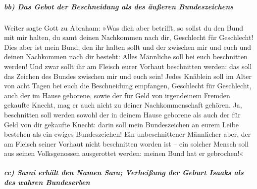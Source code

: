 \hypertarget{bb-das-gebot-der-beschneidung-als-des-uxe4uuxdferen-bundeszeichens}{%
\subparagraph{bb) Das Gebot der Beschneidung als des äußeren
Bundeszeichens}\label{bb-das-gebot-der-beschneidung-als-des-uxe4uuxdferen-bundeszeichens}}

 Weiter sagte Gott zu Abraham: »Was dich aber betrifft, so
sollst du den Bund mit mir halten, du samt deinen Nachkommen nach dir,
Geschlecht für Geschlecht!  Dies aber ist mein Bund, den
ihr halten sollt und der zwischen mir und euch und deinen Nachkommen
nach dir besteht: Alles Männliche soll bei euch beschnitten werden!
 Und zwar sollt ihr am Fleisch eurer Vorhaut beschnitten
werden: das soll das Zeichen des Bundes zwischen mir und euch sein!
 Jedes Knäblein soll im Alter von acht Tagen bei euch die
Beschneidung empfangen, Geschlecht für Geschlecht, auch der im Hause
geborene, sowie der für Geld von irgendeinem Fremden gekaufte Knecht,
mag er auch nicht zu deiner Nachkommenschaft gehören. 
Ja, beschnitten soll werden sowohl der in deinem Hause geborene als auch
der für Geld von dir gekaufte Knecht: darin soll mein Bundeszeichen an
eurem Leibe bestehen als ein ewiges Bundeszeichen!  Ein
unbeschnittener Männlicher aber, der am Fleisch seiner Vorhaut nicht
beschnitten worden ist -- ein solcher Mensch soll aus seinen
Volksgenossen ausgerottet werden: meinen Bund hat er gebrochen!«

\hypertarget{cc-sarai-erhuxe4lt-den-namen-sara-verheiuxdfung-der-geburt-isaaks-als-des-wahren-bundeserben}{%
\subparagraph{cc) Sarai erhält den Namen Sara; Verheißung der Geburt
Isaaks als des wahren
Bundeserben}\label{cc-sarai-erhuxe4lt-den-namen-sara-verheiuxdfung-der-geburt-isaaks-als-des-wahren-bundeserben}}

